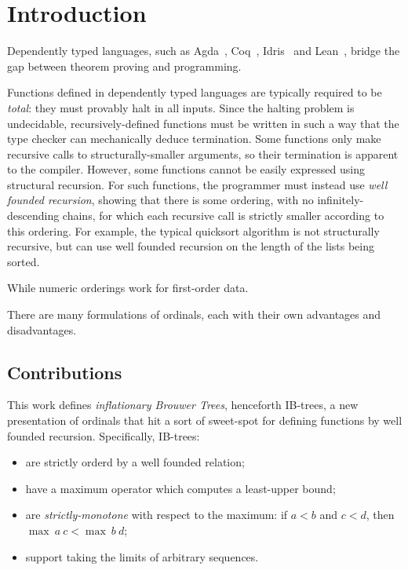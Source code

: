 \section{Introduction}
Dependently typed languages, such as Agda~\citep{TODO}, Coq~\citep{coqart},
Idris~\citep{TODO} and Lean~\citep{TODO}, bridge the gap between theorem
proving and programming.

Functions defined in dependently typed languages are typically required to be
\textit{total}: they must provably halt in all inputs. Since the halting problem
is undecidable, recursively-defined functions must be written in such a way that the type checker
can mechanically deduce termination.
Some functions only make recursive calls to structurally-smaller arguments,
so their termination is apparent to the compiler. However, some functions
cannot be easily expressed using structural recursion.
For such functions, the programmer must instead use \textit{well founded recursion}, showing that there is some ordering, with no infinitely-descending
chains, for which each recursive call is strictly smaller according to this ordering. For example, the typical quicksort algorithm is not structurally recursive, but can use well founded recursion on the length of the lists being sorted.

While numeric orderings work for first-order data.

There are many formulations of ordinals, each with their own advantages and disadvantages.


\subsection{Contributions}

This work defines \textit{inflationary Brouwer Trees}, henceforth IB-trees,
a new presentation of ordinals that hit a sort of sweet-spot for defining functions by
well founded recursion. Specifically, IB-trees:

\begin{itemize}
  \item are strictly orderd by a well founded relation;
  \item have a maximum operator which computes a least-upper bound;
  \item are \textit{strictly-monotone} with respect to the maximum: if $a < b$ and $c < d$, then $\max\ a\ c < \max\ b\ d$;
  \item support taking the limits of arbitrary sequences.
\end{itemize}

